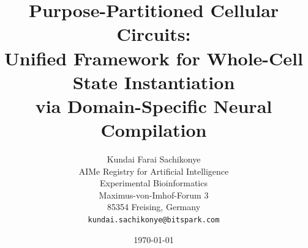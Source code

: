 \documentclass[twocolumn,10pt,a4paper]{article}
\theoremstyle{definition}
\theoremstyle{remark}
\begin{document}
\title{\textbf{Purpose-Partitioned Cellular Circuits:\\[4pt]
Unified Framework for Whole-Cell State Instantiation\\
via Domain-Specific Neural Compilation}}

\author{
Kundai Farai Sachikonye\\
AIMe Registry for Artificial Intelligence\\
Experimental Bioinformatics\\
Maximus-von-Imhof-Forum 3\\
85354 Freising, Germany\\
\texttt{kundai.sachikonye@bitspark.com}
}

\date{\today}

\maketitle
\end{document}
